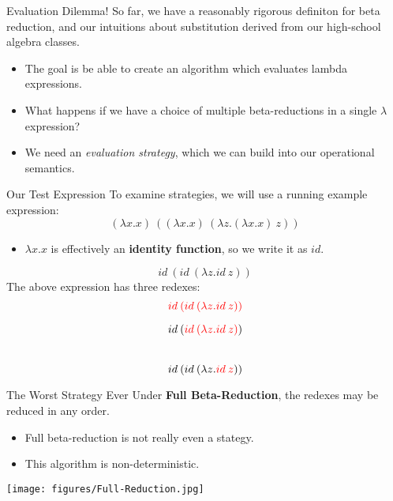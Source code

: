 \documentclass[11pt]{beamer}
\begin{document}
\begin{frame}[fragile=singleslide]{Evaluation Dilemma!}
So far, we have a reasonably rigorous definiton for beta reduction, and our intuitions about substitution derived from our high-school algebra classes.  
\begin{itemize}
\item The goal is be able to create an algorithm which evaluates lambda expressions.  
\item What happens if we have a choice of multiple beta-reductions in a single $\lambda$ expression?  
\item We need an \emph{evaluation strategy}, which we can build into our operational semantics. 
\end{itemize}

\end{frame}


\begin{frame}[fragile=singleslide]{Our Test Expression}
To examine strategies, we will use a running example expression:
\begin{equation}
(\lambda x. x)\:((\lambda x.x)\:(\lambda z. (\lambda x . x)\:z))
\end{equation}
\begin{itemize}
\item $\lambda x. x$ is effectively an \textbf{identity function}, so we write it as $id$.
\end{itemize}
\begin{equation}
id\:(id\:(\lambda z. id\:z))
\end{equation}
The above expression has three redexes:
\begin{equation}
{\color{red} id\:(id\:(\lambda z. id\:z))}
\end{equation}

\begin{equation}
id\:({\color{red} id\:(\lambda z. id\:z)})
\end{equation}
\\
\begin{equation}
id\:(id\:(\lambda z. {\color{red}id\:z}))
\end{equation}

\end{frame}

\begin{frame}[fragile=singleslide]{The Worst Strategy Ever}
Under \textbf{Full Beta-Reduction}, the redexes may be reduced in any order.  
\begin{itemize}
\item Full beta-reduction is not really even a stategy.
\item This algorithm is non-deterministic.
\end{itemize}
\begin{center}
\texttt{[image: figures/Full-Reduction.jpg]}
\end{center}
\end{frame}
\end{document}
